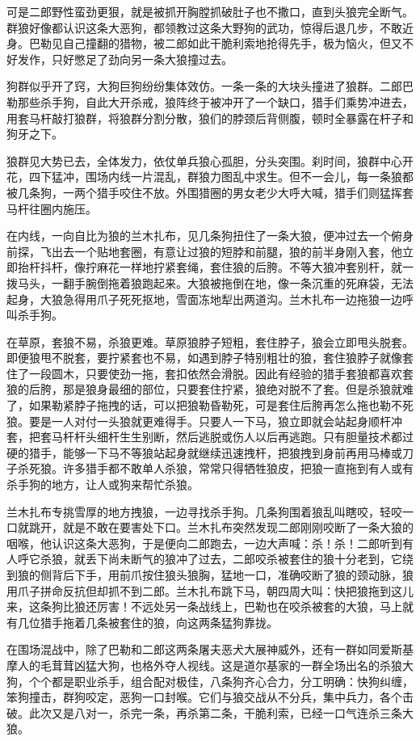 \par 可是二郎野性蛮劲更狠，就是被抓开胸膛抓破肚子也不撒口，直到头狼完全断气。群狼好像都认识这条大恶狗，都领教过这条大野狗的武功，惊得后退几步，不敢近身。巴勒见自己撞翻的猎物，被二郎如此干脆利索地抢得先手，极为恼火，但又不好发作，只好憋足了劲向另一条大狼撞过去。
\par 狗群似乎开了窍，大狗巨狗纷纷集体效仿。一条一条的大块头撞进了狼群。二郎巴勒那些杀手狗，自此大开杀戒，狼阵终于被冲开了一个缺口，猎手们乘势冲进去，用套马杆敲打狼群，将狼群分割分散，狼们的脖颈后背侧腹，顿时全暴露在杆子和狗牙之下。
\par 狼群见大势已去，全体发力，依仗单兵狼心孤胆，分头突围。刹时间，狼群中心开花，四下猛冲，围场内线一片混乱，群狼力图乱中求生。但不一会儿，每一条狼都被几条狗，一两个猎手咬住不放。外围猎圈的男女老少大呼大喊，猎手们则猛挥套马杆往圈内施压。
\par 在内线，一向自比为狼的兰木扎布，见几条狗扭住了一条大狼，便冲过去一个俯身前探，飞出去一个贴地套圈，有意让过狼的短脖和前腿，狼的前半身刚入套，他立即抬杆抖杆，像拧麻花一样地拧紧套绳，套住狼的后胯。不等大狼冲套别杆，就一拨马头，一翻手腕倒拖着狼跑起来。大狼被拖倒在地，像一条沉重的死麻袋，无法起身，大狼急得用爪子死死抠地，雪面冻地犁出两道沟。兰木扎布一边拖狼一边呼叫杀手狗。
\par 在草原，套狼不易，杀狼更难。草原狼脖子短粗，套住脖子，狼会立即甩头脱套。即便狼甩不脱套，要拧紧套也不易，如遇到脖子特别粗壮的狼，套住狼脖子就像套住了一段圆木，只要使劲一拖，套扣依然会滑脱。因此有经验的猎手套狼都喜欢套狼的后胯，那是狼身最细的部位，只要套住拧紧，狼绝对脱不了套。但是杀狼就难了，如果勒紧脖子拖拽的话，可以把狼勒昏勒死，可是套住后胯再怎么拖也勒不死狼。要是一人对付一头狼就更难得手。只要人一下马，狼立即就会站起身顺杆冲套，把套马杆杆头细杆生生别断，然后逃脱或伤人以后再逃跑。只有胆量技术都过硬的猎手，能够一下马不等狼站起身就继续迅速拽杆，把狼拽到身前再用马棒或刀子杀死狼。许多猎手都不敢单人杀狼，常常只得牺牲狼皮，把狼一直拖到有人或有杀手狗的地方，让人或狗来帮忙杀狼。
\par 兰木扎布专挑雪厚的地方拽狼，一边寻找杀手狗。几条狗围着狼乱叫瞎咬，轻咬一口就跳开，就是不敢在要害处下口。兰木扎布突然发现二郎刚刚咬断了一条大狼的咽喉，他认识这条大恶狗，于是便向二郎跑去，一边大声喊：杀！杀！二郎听到有人呼它杀狼，就丢下尚未断气的狼冲了过去，二郎咬杀被套住的狼十分老到，它绕到狼的侧背后下手，用前爪按住狼头狼胸，猛地一口，准确咬断了狼的颈动脉，狼用爪子拼命反抗但却抓不到二郎。兰木扎布跳下马，朝四周大叫：快把狼拖到这儿来，这条狗比狼还厉害！不远处另一条战线上，巴勒也在咬杀被套的大狼，马上就有几位猎手拖着几条被套住的狼，向这两条猛狗靠拢。
\par 在围场混战中，除了巴勒和二郎这两条屠夫恶犬大展神威外，还有一群如同爱斯基摩人的毛茸茸凶猛大狗，也格外夺人视线。这是道尔基家的一群全场出名的杀狼大狗，个个都是职业杀手，组合配对极佳，八条狗齐心合力，分工明确：快狗纠缠，笨狗撞击，群狗咬定，恶狗一口封喉。它们与狼交战从不分兵，集中兵力，各个击破。此次又是八对一，杀完一条，再杀第二条，干脆利索，已经一口气连杀三条大狼。
